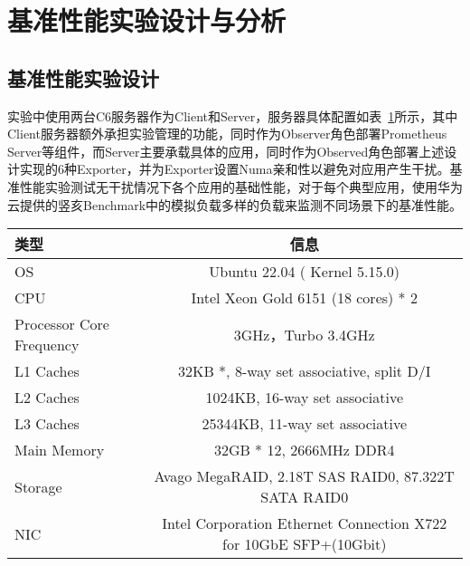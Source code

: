\section{基准性能实验设计与分析}

\subsection{基准性能实验设计}

实验中使用两台C6服务器作为Client和Server，服务器具体配置如表~\ref{tab:c6_info}所示，其中Client服务器额外承担实验管理的功能，同时作为Observer角色部署Prometheus Server等组件，而Server主要承载具体的应用，同时作为Observed角色部署上述设计实现的6种Exporter，并为Exporter设置Numa亲和性以避免对应用产生干扰。基准性能实验测试无干扰情况下各个应用的基础性能，对于每个典型应用，使用华为云提供的竖亥Benchmark中的模拟负载多样的负载来监测不同场景下的基准性能。

\begin{table}[H]
    \label{tab:c6_info}
    \footnotesize%
    \setlength{\tabcolsep}{4pt}%
    \renewcommand{\arraystretch}{1.5}%
    \centering
    \begin{tabular}{lc}
        \hline
        类型 & 信息 \\
        \hline
        OS & Ubuntu 22.04 ( Kernel 5.15.0) \\
        CPU & Intel Xeon Gold 6151 (18 cores) * 2 \\
        Processor Core Frequency & 3GHz，Turbo 3.4GHz \\
        L1 Caches & 32KB *,  8-way set associative, split D/I \\
        L2 Caches & 1024KB, 16-way set associative \\
        L3 Caches & 25344KB, 11-way set associative \\
        Main Memory & 32GB * 12, 2666MHz DDR4 \\
        Storage & Avago MegaRAID, 2.18T SAS RAID0, 87.322T SATA RAID0 \\
        NIC & Intel Corporation Ethernet Connection X722 for 10GbE SFP+(10Gbit) \\
        \hline
    \end{tabular}
\end{table}


